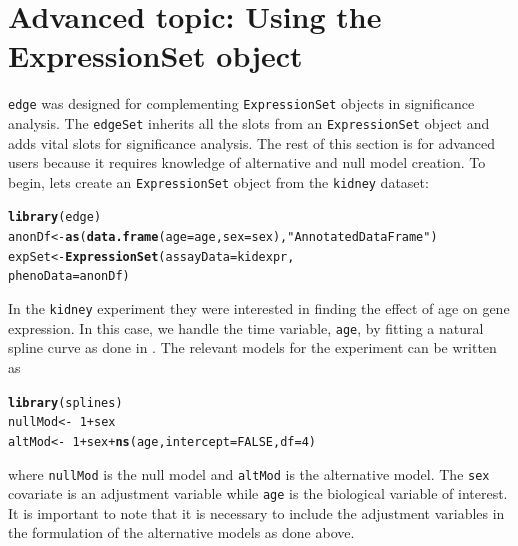\documentclass{article}\usepackage[]{graphicx}\usepackage[]{color}
\makeatletter
\newcommand{\hlnum}[1]{\textcolor[rgb]{0.686,0.059,0.569}{#1}}%
\newcommand{\hlstr}[1]{\textcolor[rgb]{0.192,0.494,0.8}{#1}}%
\newcommand{\hlopt}[1]{\textcolor[rgb]{0,0,0}{#1}}%
\newcommand{\hlstd}[1]{\textcolor[rgb]{0.345,0.345,0.345}{#1}}%
\newcommand{\hlkwb}[1]{\textcolor[rgb]{0.69,0.353,0.396}{#1}}%
\newcommand{\hlkwc}[1]{\textcolor[rgb]{0.333,0.667,0.333}{#1}}%
\newcommand{\hlkwd}[1]{\textcolor[rgb]{0.737,0.353,0.396}{\textbf{#1}}}%
\newenvironment{kframe}{%
 \def\at@end@of@kframe{}%
 \ifinner\ifhmode%
  \def\at@end@of@kframe{\end{minipage}}%
  \begin{minipage}{\columnwidth}%
 \fi\fi%
 \def\FrameCommand##1{\hskip\@totalleftmargin \hskip-\fboxsep
 \colorbox{shadecolor}{##1}\hskip-\fboxsep
     \hskip-\linewidth \hskip-\@totalleftmargin \hskip\columnwidth}%
 \MakeFramed {\advance\hsize-\width
   \@totalleftmargin\z@ \linewidth\hsize
   \@setminipage}}%
 {\par\unskip\endMakeFramed%
 \at@end@of@kframe}
\newenvironment{knitrout}{}{} %
\makeatother
\begin{document}
\section{Advanced topic: Using the ExpressionSet object}
\label{sec:advanced}
{\tt edge} was designed for complementing {\tt ExpressionSet} objects in significance analysis. The {\tt edgeSet} inherits all the slots from an {\tt ExpressionSet} object and adds vital slots for significance analysis. The rest of this section is for advanced users because it requires knowledge of alternative and null model creation. To begin, lets create an {\tt ExpressionSet} object from the {\tt kidney} dataset:
\begin{knitrout}
\color{fgcolor}\begin{kframe}
\begin{alltt}
\hlkwd{library}\hlstd{(edge)}
\hlstd{anonDf} \hlkwb{<-} \hlkwd{as}\hlstd{(}\hlkwd{data.frame}\hlstd{(}\hlkwc{age}\hlstd{=age,} \hlkwc{sex}\hlstd{=sex),} \hlstr{"AnnotatedDataFrame"}\hlstd{)}
\hlstd{expSet} \hlkwb{<-} \hlkwd{ExpressionSet}\hlstd{(}\hlkwc{assayData} \hlstd{= kidexpr,}
\hlkwc{phenoData} \hlstd{= anonDf)}
\end{alltt}
\end{kframe}
\end{knitrout}

In the {\tt kidney} experiment they were interested in finding the effect of age on gene expression. In this case, we handle the time variable, {\tt age}, by fitting a natural spline curve as done in \cite{storey:2005}. The relevant models for the experiment can be written as
\begin{knitrout}
\color{fgcolor}\begin{kframe}
\begin{alltt}
\hlkwd{library}\hlstd{(splines)}
\hlstd{nullMod} \hlkwb{<-} \hlopt{~}\hlnum{1} \hlopt{+} \hlstd{sex}
\hlstd{altMod} \hlkwb{<-} \hlopt{~}\hlnum{1} \hlopt{+} \hlstd{sex} \hlopt{+} \hlkwd{ns}\hlstd{(age,} \hlkwc{intercept} \hlstd{=} \hlnum{FALSE}\hlstd{,} \hlkwc{df} \hlstd{=} \hlnum{4}\hlstd{)}
\end{alltt}
\end{kframe}
\end{knitrout}

where {\tt nullMod} is the null model and {\tt altMod} is the alternative model. The {\tt sex} covariate is an adjustment variable while {\tt age} is the biological variable of interest. It is important to note that it is necessary to include the adjustment variables in the formulation of the alternative models as done above.
\end{document}
